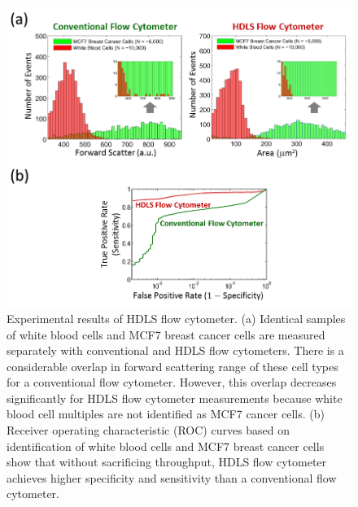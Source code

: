 \begin{figure}[htb!]
\centering
\includegraphics[scale=1]{PW2013/Figure8.png}
\caption{Experimental results of HDLS flow cytometer. (a) Identical samples of white blood cells and MCF7 breast cancer cells are measured separately with conventional and HDLS flow cytometers. There is a considerable overlap in forward scattering range of these cell types for a conventional flow cytometer. However, this overlap decreases significantly for HDLS flow cytometer measurements because white blood cell multiples are not identified as MCF7 cancer cells. (b) Receiver operating characteristic (ROC) curves based on identification of white blood cells and MCF7 breast cancer cells show that without sacrificing throughput, HDLS flow cytometer achieves higher specificity and sensitivity than a conventional flow cytometer.}
\label{fig:PW2013_Figure8}
\end{figure}
